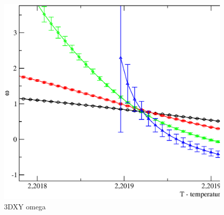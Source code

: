 \begin{figure}[!htpb]
  \centering
  \includegraphics[width=\textwidth]{./plots/3DXY/vsT/omega.eps}
  \caption{3DXY omega}
\end{figure}

